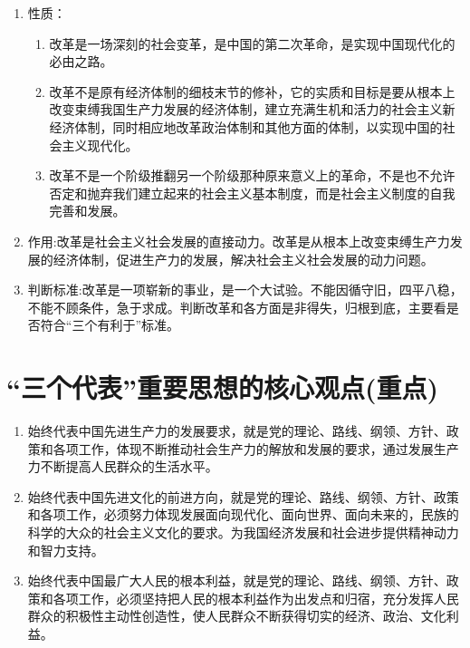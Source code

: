 \documentclass[12pt, a4paper, oneside]{ctexbook}
\begin{document}
\begin{enumerate}
\item 性质：
\begin{enumerate}[label=(\arabic*)]
\item 改革是一场深刻的社会变革，是中国的第二次革命，是实现中国现代化的必由之路。

\item 改革不是原有经济体制的细枝末节的修补，它的实质和目标是要从根本上改变束缚我国生产力发展的经济体制，建立充满生机和活力的社会主义新经济体制，同时相应地改革政治体制和其他方面的体制，以实现中国的社会主义现代化。

\item 改革不是一个阶级推翻另一个阶级那种原来意义上的革命，不是也不允许否定和抛弃我们建立起来的社会主义基本制度，而是社会主义制度的自我完善和发展。
\end{enumerate}

\item 作用:改革是社会主义社会发展的直接动力。改革是从根本上改变束缚生产力发展的经济体制，促进生产力的发展，解决社会主义社会发展的动力问题。

\item 判断标准:改革是一项崭新的事业，是一个大试验。不能因循守旧，四平八稳，不能不顾条件，急于求成。判断改革和各方面是非得失，归根到底，主要看是否符合“三个有利于”标准。
\end{enumerate}

\section{“三个代表”重要思想的核心观点(重点)}

\begin{enumerate}
\item 始终代表中国先进生产力的发展要求，就是党的理论、路线、纲领、方针、政策和各项工作，体现不断推动社会生产力的解放和发展的要求，通过发展生产力不断提高人民群众的生活水平。

\item 始终代表中国先进文化的前进方向，就是党的理论、路线、纲领、方针、政策和各项工作，必须努力体现发展面向现代化、面向世界、面向未来的，民族的科学的大众的社会主义文化的要求。为我国经济发展和社会进步提供精神动力和智力支持。

\item 始终代表中国最广大人民的根本利益，就是党的理论、路线、纲领、方针、政策和各项工作，必须坚持把人民的根本利益作为出发点和归宿，充分发挥人民群众的积极性主动性创造性，使人民群众不断获得切实的经济、政治、文化利益。
\end{enumerate}
\end{document}
